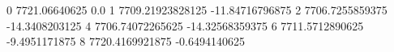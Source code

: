 0 7721.06640625 0.0
1 7709.21923828125 -11.84716796875
2 7706.7255859375 -14.3408203125
4 7706.74072265625 -14.32568359375
6 7711.5712890625 -9.4951171875
8 7720.4169921875 -0.6494140625
